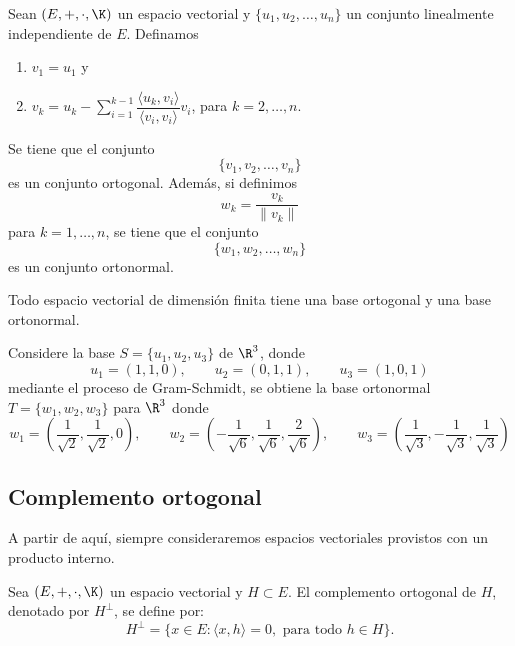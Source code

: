 \documentclass[a4,11pt]{aleph-notas}
\begin{document}
\begin{teo}
    Sean $(E,+,\cdot,\K)$ un espacio vectorial y $\{u_1, u_2, \ldots, u_n\}$ un conjunto linealmente independiente de $E$. Definamos
    \begin{enumerate}
    \item 
        $v_1 = u_1$ y
    \item
        $\displaystyle v_k = 
            u_k 
            - \sum_{i=1}^{k-1} \dfrac{\langle u_k, v_i\rangle}{\langle v_i,v_i\rangle} v_i$, para $k=2,\ldots,n$.
    \end{enumerate}
    Se tiene que el conjunto
    \[
        \{v_1, v_2, \ldots, v_n\}
    \]
    es un conjunto ortogonal. Además, si definimos
    \[
        w_k = \dfrac{v_k}{\|v_k\|}
    \]
    para $k=1,\ldots,n$, se tiene que el conjunto
    \[
        \{w_1, w_2, \ldots, w_n\}
    \]
    es un conjunto ortonormal.
\end{teo}


\begin{teo}
    Todo espacio vectorial de dimensión finita tiene una base ortogonal y una base ortonormal.
\end{teo}


\begin{ejem}
    Considere la base $S = \{u_1, u_2, u_3\}$ de $\R^3$, donde 
    \[
        u_1 = (1,1,0), \qquad u_2 = (0, 1,1), \qquad u_3 = (1,0,1)
    \]
    mediante el proceso de Gram-Schmidt, se obtiene la base ortonormal $T=\{w_1, w_2, w_3\}$ para $\R^3$ donde
    \[
        w_1 = \left(\dfrac{1}{\sqrt{2}},\dfrac{1}{\sqrt{2}},0\right), \qquad
        w_2 = \left(-\dfrac{1}{\sqrt{6}},\dfrac{1}{\sqrt{6}},
        \dfrac{2}{\sqrt{6}}\right), \qquad
        w_3 = \left(\dfrac{1}{\sqrt{3}},-\dfrac{1}{\sqrt{3}},
        \dfrac{1}{\sqrt{3}}\right)
    \]
\end{ejem}

\subsection{Complemento ortogonal}

A partir de aquí, siempre consideraremos espacios vectoriales provistos con un producto interno.

\begin{defi}
    Sea $(E,+,\cdot,\K)$ un espacio vectorial y
    $H \subset E$. El complemento ortogonal de $H$, denotado por $H^\perp$, se define por:
    \[
        H^\perp = \{ x \in E: \langle x, h \rangle = 0, \text{ para todo } h \in H\}.
    \]
\end{defi}
\end{document}
